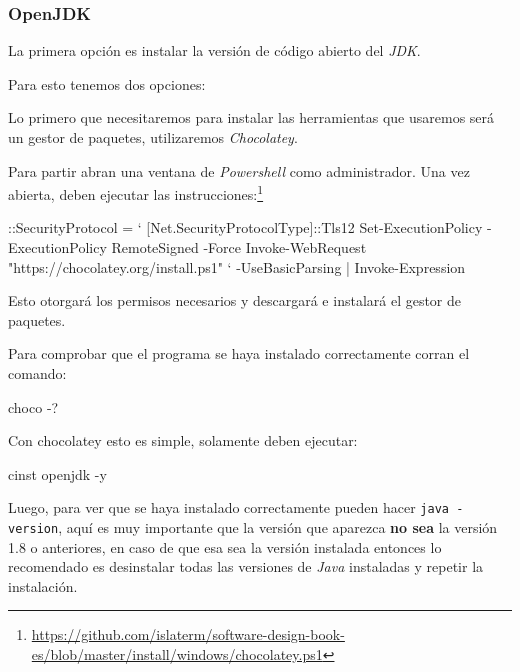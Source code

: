 \subsubsection{OpenJDK}
  La primera opción es instalar la versión de código abierto del \textit{JDK}.

  Para esto tenemos dos opciones:
  \begin{tcolorbox}[enhanced, breakable, title=OpenJDK con Chocolatey (Recomendado)]
    Lo primero que necesitaremos para instalar las herramientas que usaremos será un gestor de 
    paquetes, utilizaremos \textit{Chocolatey}.\autocite{choco}
  
    Para partir abran una ventana de \textit{Powershell} como administrador.
    Una vez abierta, deben ejecutar las instrucciones:\footnote{
      \url{https://github.com/islaterm/software-design-book-es/blob/master/install/windows/chocolatey.ps1}
    }
    \begin{powershell}
      ::SecurityProtocol = `
        [Net.SecurityProtocolType]::Tls12
      Set-ExecutionPolicy -ExecutionPolicy RemoteSigned -Force
      Invoke-WebRequest "https://chocolatey.org/install.ps1" `
        -UseBasicParsing | Invoke-Expression
    \end{powershell}
  
    Esto otorgará los permisos necesarios y descargará e instalará el gestor de paquetes.
  
    Para comprobar que el programa se haya instalado correctamente corran el comando:
    \begin{powershell}
      choco -?
    \end{powershell}
    
    Con chocolatey esto es simple, solamente deben ejecutar:
    \begin{powershell}
      cinst openjdk -y
    \end{powershell}
    
    Luego, para ver que se haya instalado correctamente pueden hacer \texttt{java -version}, aquí es
    muy importante que la versión que aparezca \textbf{no sea} la versión 1.8 o anteriores, en caso 
    de que esa sea la versión instalada entonces lo recomendado es desinstalar todas las versiones
    de \textit{Java} instaladas y repetir la instalación.
  \end{tcolorbox}
